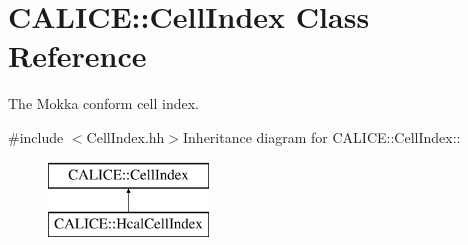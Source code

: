 \section{CALICE::CellIndex Class Reference}
\label{classCALICE_1_1CellIndex}


The Mokka conform cell index.  


{\ttfamily \#include $<$CellIndex.hh$>$}Inheritance diagram for CALICE::CellIndex::\begin{figure}[H]
\begin{center}
\leavevmode
\includegraphics[height=2cm]{classCALICE_1_1CellIndex}
\end{center}
\end{figure}
